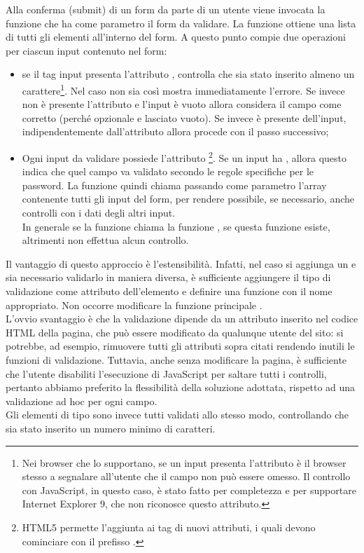 \documentclass[12pt]{article}
\begin{document}
	Alla conferma (submit) di un form da parte di un utente viene invocata la funzione  che ha come parametro il form da validare. La funzione ottiene una lista di tutti gli elementi  all'interno del form.
	A questo punto compie due operazioni per ciascun input contenuto nel form:
	\begin{itemize}
		\item se il tag input presenta l'attributo , controlla che sia stato inserito almeno un carattere\footnote{Nei browser che lo supportano, se un input presenta l'attributo  è il browser stesso a segnalare all'utente che il campo non può essere omesso. Il controllo con JavaScript, in questo caso, è stato fatto per completezza e per supportare Internet Explorer 9, che non riconosce questo attributo.}. Nel caso non sia così mostra immediatamente l'errore. Se invece non è presente l'attributo e l'input è vuoto allora considera il campo come corretto (perché opzionale e lasciato vuoto). Se invece è presente dell'input, indipendentemente dall'attributo  allora procede con il passo successivo;
		\item Ogni input da validare possiede l'attributo \footnote{HTML5 permette l'aggiunta ai tag di nuovi attributi, i quali devono cominciare con il prefisso .}. Se un input ha , allora questo indica che quel campo va validato secondo le regole specifiche per le password. La funzione quindi chiama  passando come parametro l'array contenente tutti gli input del form, per rendere possibile, se necessario, anche controlli con i dati degli altri input.\\ In generale se  la funzione  chiama la funzione , se questa funzione esiste, altrimenti non effettua alcun controllo.
	\end{itemize}
	Il vantaggio di questo approccio è l'estensibilità. Infatti, nel caso si aggiunga un  e sia necessario validarlo in maniera diversa, è sufficiente aggiungere il tipo di validazione come attributo dell'elemento e definire una funzione con il nome appropriato. Non occorre modificare la funzione principale .\\ L'ovvio svantaggio è che la validazione dipende da un attributo inserito nel codice HTML della pagina, che può essere modificato da qualunque utente del sito: si potrebbe, ad esempio, rimuovere tutti gli attributi sopra citati rendendo inutili le funzioni di validazione. Tuttavia, anche senza modificare la pagina, è sufficiente che l'utente disabiliti l'esecuzione di JavaScript per saltare tutti i controlli, pertanto abbiamo preferito la flessibilità della soluzione adottata, rispetto ad una validazione ad hoc per ogni campo.\\
	Gli elementi di tipo  sono invece tutti validati allo stesso modo, controllando che sia stato inserito un numero minimo di caratteri. \\
	
\end{document}
